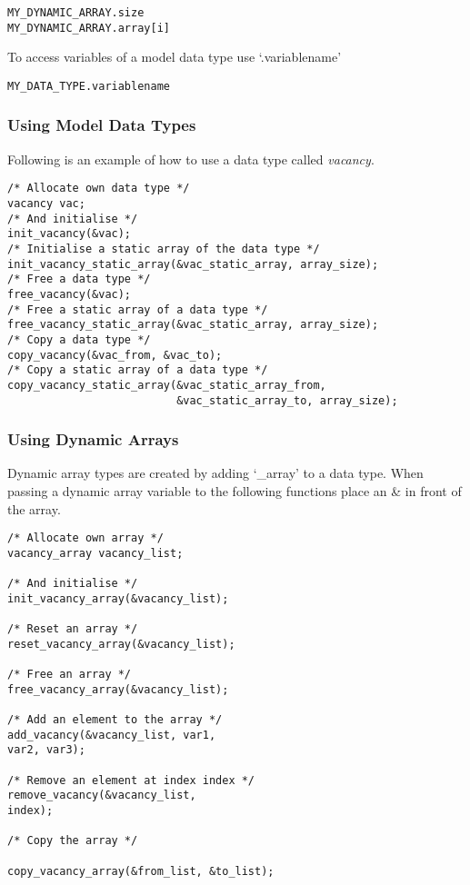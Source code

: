 \begin{mylisting}
\begin{verbatim}
MY_DYNAMIC_ARRAY.size
MY_DYNAMIC_ARRAY.array[i]
\end{verbatim}
\end{mylisting}

To access variables of a model data type use `.variablename'

\begin{mylisting}
\begin{verbatim}
MY_DATA_TYPE.variablename
\end{verbatim}
\end{mylisting}

\subsubsection{Using Model Data Types}

Following is an example of how to use a data type called
\emph{vacancy}.

\begin{mylisting}
\begin{verbatim}
/* Allocate own data type */
vacancy vac;
/* And initialise */
init_vacancy(&vac);
/* Initialise a static array of the data type */
init_vacancy_static_array(&vac_static_array, array_size);
/* Free a data type */
free_vacancy(&vac);
/* Free a static array of a data type */
free_vacancy_static_array(&vac_static_array, array_size);
/* Copy a data type */
copy_vacancy(&vac_from, &vac_to);
/* Copy a static array of a data type */
copy_vacancy_static_array(&vac_static_array_from,
                          &vac_static_array_to, array_size);
\end{verbatim}
\end{mylisting}


\subsubsection{Using Dynamic Arrays}

Dynamic array types are created by adding `\_array' to a data type.
When passing a dynamic array variable to the following functions
place an \& in front of the array.

\begin{mylisting}
\begin{verbatim}
/* Allocate own array */
vacancy_array vacancy_list;

/* And initialise */
init_vacancy_array(&vacancy_list);

/* Reset an array */
reset_vacancy_array(&vacancy_list);

/* Free an array */
free_vacancy_array(&vacancy_list);

/* Add an element to the array */
add_vacancy(&vacancy_list, var1,
var2, var3);

/* Remove an element at index index */
remove_vacancy(&vacancy_list,
index);

/* Copy the array */

copy_vacancy_array(&from_list, &to_list);
\end{verbatim}
\end{mylisting}

